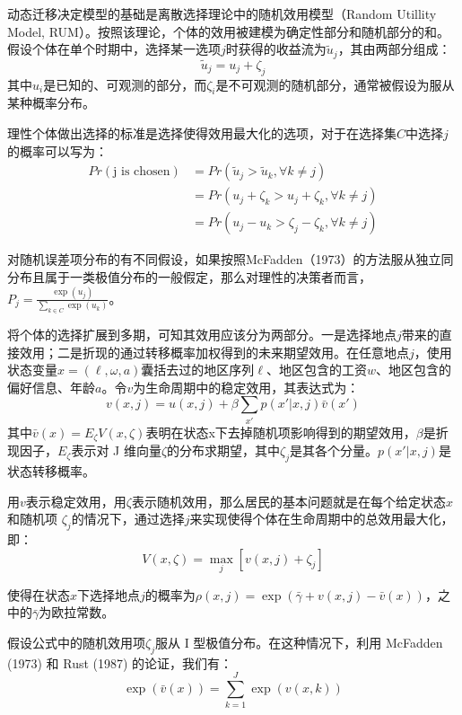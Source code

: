 \documentclass[a4paper,12pt]{article}
\begin{document}
动态迁移决定模型的基础是离散选择理论中的随机效用模型（Random Utillity Model, RUM）。按照该理论，个体的效用被建模为确定性部分和随机部分的和。假设个体在单个时期中，选择某一选项$j$时获得的收益流为$\tilde u_j$，其由两部分组成：
\begin{equation}
  \tilde u_j = u_j + \zeta_j
\end{equation}
其中$u_i$是已知的、可观测的部分，而$\zeta_i$是不可观测的随机部分，通常被假设为服从某种概率分布。

理性个体做出选择的标准是选择使得效用最大化的选项，对于在选择集$C$中选择$j$的概率可以写为：
\begin{equation}
\begin{split}
  Pr(\text{j is chosen})&=Pr(\tilde u_j > \tilde u_k, \forall k \neq j)
  \\&=Pr(u_j+\zeta_k>u_j+\zeta_k, \forall k \neq j)
  \\&=Pr(u_j-u_k>\zeta_j-\zeta_k, \forall k \neq j)
\end{split}
\end{equation}

对随机误差项分布的有不同假设，如果按照McFadden（1973）的方法服从独立同分布且属于一类极值分布的一般假定，那么对理性的决策者而言，$P_{j}=\frac{\exp(u_{j})}{\sum\limits_{k\in C} \exp(u_k)}$。

将个体的选择扩展到多期，可知其效用应该分为两部分。一是选择地点$j$带来的直接效用；二是折现的通过转移概率加权得到的未来期望效用。在任意地点$j$，使用状态变量$x=(\ell,\omega,a)$囊括去过的地区序列$\ell$、地区包含的工资$w$、地区包含的偏好信息、年龄$a$。令$v$为生命周期中的稳定效用，其表达式为：
\begin{equation}
  v(x, j) = u(x, j) + \beta \sum_{x'} p(x' | x, j) \bar{v}(x')
\end{equation}
其中$\bar{v}(x) = E_{\zeta} V(x, \zeta)$表明在状态x下去掉随机项影响得到的期望效用，$\beta$是折现因子，$E_{\zeta}$表示对 J 维向量$\zeta$的分布求期望，其中$\zeta_{j}$是其各个分量。$p(x'|x,j)$是状态转移概率。

用$v$表示稳定效用，用$\zeta$表示随机效用，那么居民的基本问题就是在每个给定状态$x$和随机项 $\zeta_j$的情况下，通过选择$j$来实现使得个体在生命周期中的总效用最大化，即：
\begin{equation}
V(x,\zeta)=\max\limits_{j}[v(x,j)+\zeta_{j}]
\end{equation}

使得在状态$x$下选择地点$j$的概率为$\rho(x,j)=\exp(\bar \gamma+v(x,j)-\bar v(x))$，之中的$\bar \gamma$为欧拉常数。

假设公式中的随机效用项$\zeta_j$服从 I 型极值分布。在这种情况下，利用 McFadden (1973) 和 Rust (1987) 的论证，我们有：
\begin{equation}
  \exp\left(\bar{v}(x)\right) = \sum_{k=1}^J \exp\left(v(x, k)\right)
\end{equation}
\end{document}
